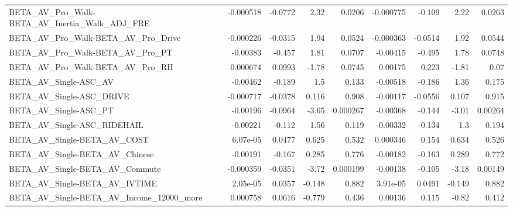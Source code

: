 \begin{tabular}{lrrrrrrrr}
BETA\_AV\_Pro\_Walk-BETA\_AV\_Inertia\_Walk\_ADJ\_FRE      &   -0.000518 &      -0.0772 &     2.32 &   0.0206 &  -0.000775 &      -0.109 &         2.22 &        0.0263 \\
BETA\_AV\_Pro\_Walk-BETA\_AV\_Pro\_Drive                 &   -0.000226 &      -0.0315 &     1.94 &   0.0524 &  -0.000363 &     -0.0514 &         1.92 &        0.0544 \\
BETA\_AV\_Pro\_Walk-BETA\_AV\_Pro\_PT                    &    -0.00383 &       -0.457 &     1.81 &   0.0707 &   -0.00415 &      -0.495 &         1.78 &        0.0748 \\
BETA\_AV\_Pro\_Walk-BETA\_AV\_Pro\_RH                    &    0.000674 &       0.0993 &    -1.78 &   0.0745 &    0.00175 &       0.223 &        -1.81 &          0.07 \\
BETA\_AV\_Single-ASC\_AV                              &    -0.00462 &       -0.189 &      1.5 &    0.133 &   -0.00518 &      -0.186 &         1.36 &         0.175 \\
BETA\_AV\_Single-ASC\_DRIVE                           &   -0.000717 &      -0.0378 &    0.116 &    0.908 &   -0.00117 &     -0.0556 &        0.107 &         0.915 \\
BETA\_AV\_Single-ASC\_PT                              &    -0.00196 &      -0.0964 &    -3.65 & 0.000267 &   -0.00368 &      -0.144 &        -3.01 &       0.00264 \\
BETA\_AV\_Single-ASC\_RIDEHAIL                        &    -0.00221 &       -0.112 &     1.56 &    0.119 &   -0.00332 &      -0.134 &          1.3 &         0.194 \\
BETA\_AV\_Single-BETA\_AV\_COST                        &    6.07e-05 &       0.0477 &    0.625 &    0.532 &   0.000346 &       0.154 &        0.634 &         0.526 \\
BETA\_AV\_Single-BETA\_AV\_Chinese                     &    -0.00191 &       -0.167 &    0.285 &    0.776 &   -0.00182 &      -0.163 &        0.289 &         0.772 \\
BETA\_AV\_Single-BETA\_AV\_Commute                     &   -0.000359 &      -0.0351 &    -3.72 & 0.000199 &   -0.00138 &      -0.105 &        -3.18 &       0.00149 \\
BETA\_AV\_Single-BETA\_AV\_IVTIME                      &    2.05e-05 &       0.0357 &   -0.148 &    0.882 &   3.91e-05 &      0.0491 &       -0.149 &         0.882 \\
BETA\_AV\_Single-BETA\_AV\_Income\_12000\_more           &    0.000758 &       0.0616 &   -0.779 &    0.436 &    0.00136 &       0.115 &        -0.82 &         0.412 \\

\end{tabular}

